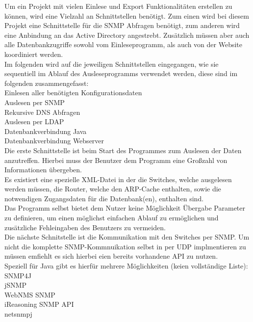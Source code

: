 Um ein Projekt mit vielen Einlese und Export Funktionalitäten erstellen zu können, wird eine Vielzahl an Schnittstellen benötigt.
Zum einen wird bei diesem Projekt eine Schnittstelle für die SNMP Abfragen benötigt, zum anderen wird eine Anbindung an das Active Directory angestrebt. Zusätzlich müssen aber auch alle Datenbankzugriffe sowohl vom Einleseprogramm, als auch von der Website koordiniert werden.\\
Im folgenden wird auf die jeweiligen Schnittstellen eingegangen, wie sie sequentiell im Ablauf des Ausleseprogramms verwendet werden, diese sind im folgenden zusammengefasst:\\
Einlesen aller benötigten Konfigurationsdaten\\
Auslesen per SNMP\\
Rekursive DNS Abfragen\\
Auslesen per LDAP\\
Datenbankverbindung Java\\
Datenbankverbindung Webserver\\


Die erste Schnittstelle ist beim Start des Programmes zum Auslesen der Daten anzutreffen. Hierbei muss der Benutzer dem Programm eine Großzahl von Informationen übergeben.\\
Es existiert eine spezielle XML-Datei in der die Switches, welche ausgelesen werden müssen, die Router, welche den ARP-Cache enthalten, sowie die notwendigen Zugangsdaten für die Datenbank(en), enthalten sind. \\
Das Programm selbst bietet dem Nutzer keine Möglichkeit Übergabe Parameter zu definieren, um einen möglichst einfachen Ablauf zu ermöglichen und zusätzliche Fehleingaben des Benutzers zu vermeiden.\\
Die nächste Schnitstelle ist die Kommunikation mit den Switches per SNMP. Um nicht die komplette SNMP-Kommnuikation selbst in per UDP implmentieren zu müssen emfiehlt es sich hierbei eien bereits vorhandene API zu nutzen.\\
Speziell für Java gibt es hierfür mehrere Möglichkeiten (keien vollständige Liste):\\
SNMP4J\\
jSNMP\\
WebNMS SNMP\\
iReasoning SNMP API\\
netsnmpj\\


